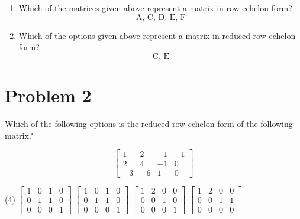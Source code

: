 \documentclass[letter,11pt]{article}
\begin{document}
\begin{enumerate}[label = \alph*.]
    \item Which of the matrices given above represent a matrix in row echelon form?
    $$\boxed{\text{A, C, D, E, F}}$$
    \item  Which of the options given above represent a matrix in reduced row echelon form?
    $$\boxed{\text{C, E}}$$
\end{enumerate}

\section{Problem 2} Which of the following options is the reduced row echelon form of the following matrix?

$$\begin{bmatrix} 1 & 2 & -1 & -1 \\ 2 & 4 & -1 & 0 \\ -3 & -6 & 1 & 0 \end{bmatrix}$$

\begin{tasks}(4)
\task $\begin{bmatrix}1 & 0 & 1 & 0 \\ 0 & 1 & 1 & 0 \\ 0 & 0 & 0 & 1\end{bmatrix}$
\task $\begin{bmatrix}1 & 0 & 1 & 0 \\ 0 & 1 & 1 & 0 \\ 0 & 0 & 0 & 1\end{bmatrix}$
\task $\begin{bmatrix}1 & 2 & 0 & 0 \\ 0 & 0 & 1 & 0 \\ 0 & 0 & 0 & 1\end{bmatrix}$
\task $\begin{bmatrix}1 & 2 & 0 & 0 \\ 0 & 0 & 1 & 1 \\ 0 & 0 & 0 & 0\end{bmatrix}$
\end{tasks}
\end{document}
